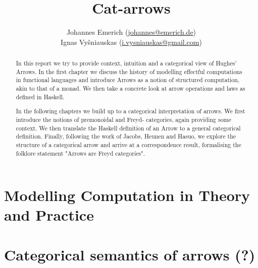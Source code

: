 \documentclass[12pt,a4paper,titlepage]{scrreprt}
\title{Cat-arrows}
\author{%
    Johannes Emerich
        (\href{mailto:Johannes@emerich.de}{johannes@emerich.de})\\
    Ignas Vyšniauskas
        (\href{mailto:i.vysniauskas@gmail.com}{i.vysniauskas@gmail.com})
}
\date{}
\theoremstyle{definition}
\theoremstyle{plain}
\begin{document}
\maketitle

\begin{abstract}
    In this report we try to provide context, intuition and a categorical view
    of Hughes' Arrows. In the first chapter we discuss the history of modelling
    effectful computations in functional languages and introduce Arrows as a
    notion of structured computation, akin to that of a monad. We then take a
    concrete look at arrow operations and laws as defined in Haskell.

    In the following chapters we build up to a categorical interpretation of
    arrows. We first introduce the notions of premonoidal and Freyd-
    categories, again providing some context. We then translate the Haskell
    definition of an Arrow to a general categorical definition. Finally,
    following the work of Jacobs, Heunen and Hasuo, we explore the structure of
    a categorical arrow and arrive at a correspondence result, formalising
    the folklore statement "Arrows are Freyd categories".
\end{abstract}


\chapter{Modelling Computation in Theory and Practice}
    
    
\chapter{Categorical semantics of arrows (?)}
    
    
    

\nocite{mustard}
\printbibliography
\end{document}
